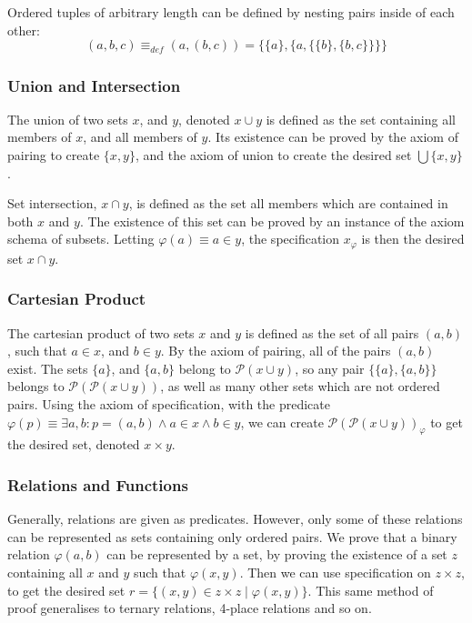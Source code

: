 \documentclass[11pt]{report}
\theoremstyle{definition}
\theoremstyle{theorem}
\theoremstyle{lemma}
\begin{document}
Ordered tuples of arbitrary length can be defined by nesting pairs inside of each other:
$$(a,b,c) \equiv_{\mathit{def}} (a,(b,c)) = \{\{a\},\{a, \{\{b\},\{b,c\}\}\}\}$$

\subsubsection*{Union and Intersection}
The union of two sets $x$, and $y$, denoted $x\cup y$ is defined as the set containing all members of $x$, and all members of $y$. Its existence can be proved by the axiom of pairing to create $\{x,y\}$, and the axiom of union to create the desired set $\bigcup \{x,y\}$.

Set intersection, $x \cap y$, is defined as the set all members which are contained in both $x$ and $y$.
The existence of this set can be proved by an instance of the axiom schema of subsets. Letting $\varphi(a) \equiv a \in y$, the specification $x_\varphi$ is then the desired set $x \cap y$.

\subsubsection*{Cartesian Product}
The cartesian product of two sets $x$ and $y$ is defined as the set of all pairs $(a,b)$, such that $a\in x$, and $b\in y$.
By the axiom of pairing, all of the pairs $(a,b)$ exist.
The sets $\{a\}$, and $\{a,b\}$ belong to $\mathcal{P}(x\cup y)$, so any pair $\{\{a\},\{a,b\}\}$ belongs to $\mathcal{P}(\mathcal{P}(x\cup y))$, as well as many other sets which are not ordered pairs.
Using the axiom of specification, with the predicate
$\varphi(p) \equiv \exists a,b: p = (a,b) \wedge a\in x \wedge b\in y$, we can create $\mathcal{P}(\mathcal{P}(x\cup y))_{\varphi}$ to get the desired set, denoted $x\times y$.

\subsubsection*{Relations and Functions}
Generally, relations are given as predicates.
However, only some of these relations can be represented as sets containing only ordered pairs.
We prove that a binary relation $\varphi(a,b)$ can be represented by a set, by proving the existence of a set $z$ containing all $x$ and $y$ such that $\varphi(x,y)$.
Then we can use specification on $z\times z$, to get the desired set $r = \{(x,y) \in z\times z \mid \varphi(x,y)\}$.
This same method of proof generalises to ternary relations, 4-place relations and so on.
\end{document}
